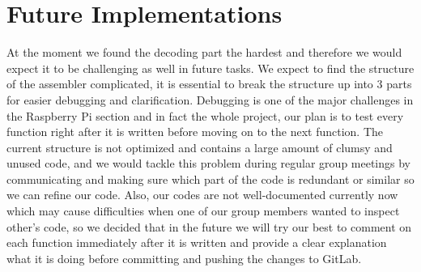 \documentclass[11pt]{article}
\begin{document}
\section{Future Implementations}

At the moment we found the decoding part the hardest and therefore we would expect it to be challenging as well in future tasks. We expect to find the structure of the assembler complicated, it is essential to break the structure up into 3 parts for easier debugging and clarification. Debugging is one of the major challenges in the Raspberry Pi section and in fact the whole project, our plan is to test every function right after it is written before moving on to the next function. The current structure is not optimized and contains a large amount of clumsy and unused code, and we would tackle this problem during regular group meetings by communicating and making sure which part of the code is redundant or similar so we can refine our code. Also, our codes are not well-documented currently now which may cause difficulties when one of our group members wanted to inspect other’s code, so we decided that in the future we will try our best to comment on each function immediately after it is written and provide a clear explanation what it is doing before committing and pushing the changes to GitLab.
\end{document}
